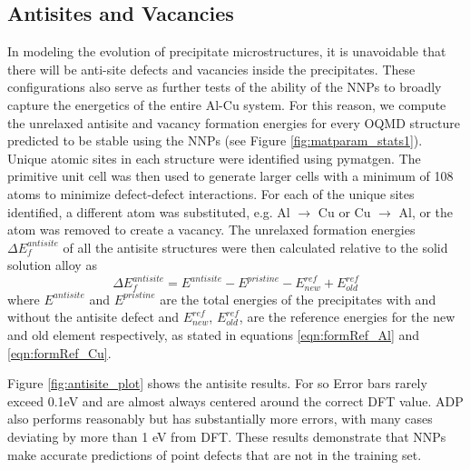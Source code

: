 \documentclass{article}
\begin{document}
\subsection{Antisites and Vacancies} \label{sct:antsite_results}

In modeling the evolution of precipitate microstructures, it is unavoidable that there will be anti-site defects and vacancies inside the precipitates.  These configurations also serve as further tests of the ability of the NNPs to broadly capture the energetics of the entire Al-Cu system.
For this reason, we compute the unrelaxed antisite and vacancy formation energies for every OQMD structure predicted to be stable using the NNPs (see Figure \ref{fig:matparam_stats1}). 
Unique atomic sites in each structure were identified using pymatgen.
The primitive unit cell was then used to generate larger cells with a minimum of 108 atoms to minimize defect-defect interactions.
For each of the unique sites identified, a different atom was substituted, e.g. Al $\rightarrow$ Cu or Cu $\rightarrow$ Al, or the atom was removed to create a vacancy.  The unrelaxed formation energies $\Delta E^{antisite}_f$ of all the antisite structures were then calculated relative to the solid solution alloy as
\begin{equation}
\Delta E^{antisite}_f = E^{antisite} - E^{pristine} - E^{ref}_{new} + E^{ref}_{old}
\end{equation}
where $E^{antisite}$ and $E^{pristine}$ are the total energies of the precipitates with and without the antisite defect and $E^{ref}_{new}$, $E^{ref}_{old}$,  are the reference energies for the new and old element respectively, as stated in 
equations \ref{eqn:formRef_Al} and \ref{eqn:formRef_Cu}.

Figure \ref{fig:antisite_plot} shows the antisite results.
For so
Error bars rarely exceed 0.1eV and are almost always centered around the correct DFT value.
ADP also performs reasonably but has substantially more errors, with many cases deviating by more than 1 eV from DFT.
These results demonstrate that NNPs make accurate predictions of point defects that are not in the training set. 
\end{document}
